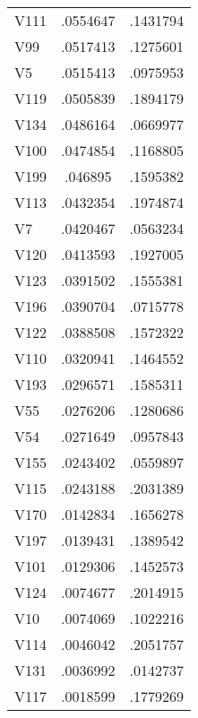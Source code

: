 \documentclass{article}
\begin{document}
\begin{table}[tbp]
\begin{tabularx}{\linewidth}{@{}lCC@{}}
V111&.0554647&.1431794 \tabularnewline
V99&.0517413&.1275601 \tabularnewline
V5&.0515413&.0975953 \tabularnewline
V119&.0505839&.1894179 \tabularnewline
V134&.0486164&.0669977 \tabularnewline
V100&.0474854&.1168805 \tabularnewline
V199&.046895&.1595382 \tabularnewline
V113&.0432354&.1974874 \tabularnewline
V7&.0420467&.0563234 \tabularnewline
V120&.0413593&.1927005 \tabularnewline
V123&.0391502&.1555381 \tabularnewline
V196&.0390704&.0715778 \tabularnewline
V122&.0388508&.1572322 \tabularnewline
V110&.0320941&.1464552 \tabularnewline
V193&.0296571&.1585311 \tabularnewline
V55&.0276206&.1280686 \tabularnewline
V54&.0271649&.0957843 \tabularnewline
V155&.0243402&.0559897 \tabularnewline
V115&.0243188&.2031389 \tabularnewline
V170&.0142834&.1656278 \tabularnewline
V197&.0139431&.1389542 \tabularnewline
V101&.0129306&.1452573 \tabularnewline
V124&.0074677&.2014915 \tabularnewline
V10&.0074069&.1022216 \tabularnewline
V114&.0046042&.2051757 \tabularnewline
V131&.0036992&.0142737 \tabularnewline
V117&.0018599&.1779269 \tabularnewline
\bottomrule 

\end{tabularx}
\end{table}
\end{document}
